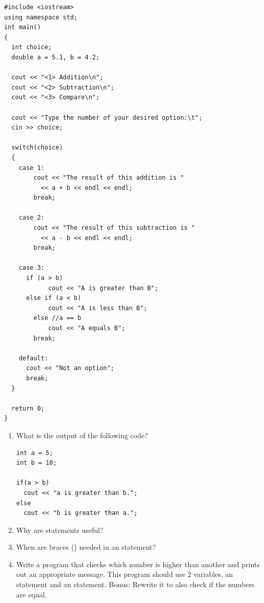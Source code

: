 \noindent\begin{minipage}{\linewidth}\begin{lstlisting}
#include <iostream>
using namespace std;
int main()
{
  int choice;
  double a = 5.1, b = 4.2;

  cout << "<1> Addition\n";
  cout << "<2> Subtraction\n";
  cout << "<3> Compare\n";

  cout << "Type the number of your desired option:\t";
  cin >> choice;

  switch(choice)
  {
    case 1:
	    cout << "The result of this addition is " 
	      << a + b << endl << endl;
	    break;

    case 2:
	    cout << "The result of this subtraction is "
	      << a - b << endl << endl;
	    break;

    case 3:
      if (a > b)
		    cout << "A is greater than B";
      else if (a < b)
		    cout << "A is less than B";
	    else //a == b
		    cout << "A equals B";
	    break;

    default:
      cout << "Not an option";
      break;
  }

  return 0;
}
\end{lstlisting}\end{minipage}








\begin{enumerate}
\item What is the output of the following code?

\noindent\begin{minipage}{\linewidth}\begin{lstlisting}
int a = 5;
int b = 10;

if(a > b)
  cout << "a is greater than b.";
else
  cout << "b is greater than a.";
\end{lstlisting}\end{minipage}

\item Why are  statements useful?

\item When are braces (\Code{\{\}}) needed in an  statement?

\item Write a program that checks which number is higher than another and prints out an appropriate message. This program should use 2 variables, an  statement and an  statement. Bonus: Rewrite it to also check if the numbers are equal.

\end{enumerate}

